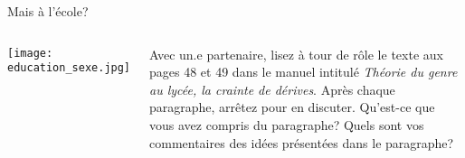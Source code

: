 \begin{frame}{Mais à l'école?}
  \begin{columns}
      \begin{center}
        \texttt{[image: education\_sexe.jpg]}
      \end{center}
      Avec un.e partenaire, lisez à tour de rôle le texte aux pages 48 et 49 dans le manuel intitulé \emph{Théorie du genre au lycée, la crainte de dérives}.
      Après chaque paragraphe, arrêtez pour en discuter.
      Qu'est-ce que vous avez compris du paragraphe?
      Quels sont vos commentaires des idées présentées dans le paragraphe?
  \end{columns}
\end{frame}